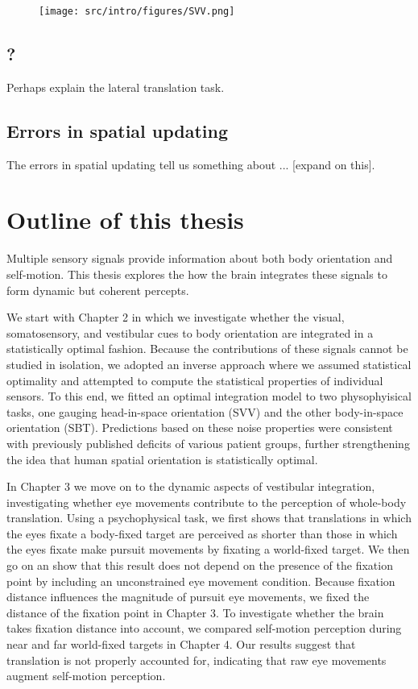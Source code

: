 \begin{figure}
    \texttt{[image: src/intro/figures/SVV.png]}

    \caption{}
    \label{intro:fig5}
\end{figure}


\subsection{?}

Perhaps explain the lateral translation task.

\subsection{Errors in spatial updating}

The errors in spatial updating tell us something about ... [expand on this].


\section{Outline of this thesis}
Multiple sensory signals provide information about both body orientation and self-motion. This thesis explores the how the brain integrates these signals to form dynamic but coherent percepts.

We start with Chapter 2 in which we investigate whether the visual, somatosensory, and vestibular cues to body orientation are integrated in a statistically optimal fashion. Because the contributions of these signals cannot be studied in isolation, we adopted an inverse approach where we assumed statistical optimality and attempted to compute the statistical properties of individual sensors. To this end, we fitted an optimal integration model to two physophyisical tasks, one gauging head-in-space orientation (SVV) and the other body-in-space orientation (SBT). Predictions based on these noise properties were consistent with previously published deficits of various patient groups, further strengthening the idea that human spatial orientation is statistically optimal.

In Chapter 3 we move on to the dynamic aspects of vestibular integration, investigating whether eye movements contribute to the perception of whole-body translation. Using a psychophysical task, we first shows that translations in which the eyes fixate a body-fixed target are perceived as shorter than those in which the eyes fixate make pursuit movements by fixating a world-fixed target. We then go on an show that this result does not depend on the presence of the fixation point by including an unconstrained eye movement condition. Because fixation distance influences the magnitude of pursuit eye movements, we fixed the distance of the fixation point in Chapter 3. To investigate whether the brain takes fixation distance into account, we compared self-motion perception during near and far world-fixed targets in Chapter 4. Our results suggest that translation is not properly accounted for, indicating that raw eye movements augment self-motion perception.

